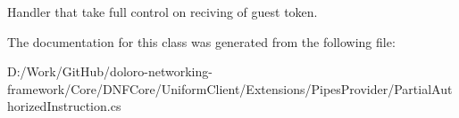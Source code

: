 Handler that take full control on reciving of guest token. 



The documentation for this class was generated from the following file\+:\begin{DoxyCompactItemize}
\item 
D\+:/\+Work/\+Git\+Hub/doloro-\/networking-\/framework/\+Core/\+D\+N\+F\+Core/\+Uniform\+Client/\+Extensions/\+Pipes\+Provider/Partial\+Authorized\+Instruction.\+cs\end{DoxyCompactItemize}
